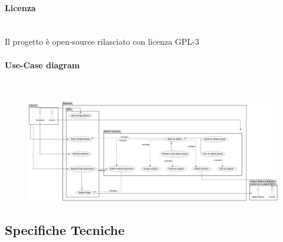 \documentclass[11pt]{article}
\begin{document}
\paragraph{Licenza}\mbox{}\\
Il progetto è open-source rilasciato con licenza GPL-3
\paragraph{Use-Case diagram}\mbox{}\\
    \begin{figure}[H]
    	\centering
    	\includegraphics[width=1\textwidth]{general_use_case.png}
	\end{figure}
\subsection{Specifiche Tecniche}
\end{document}
